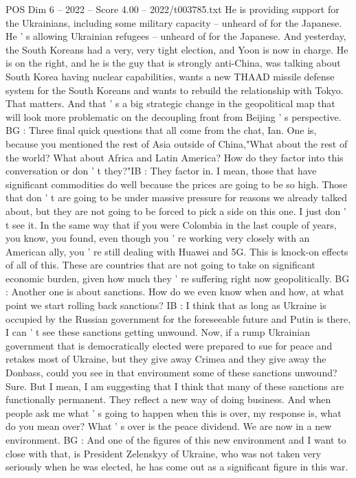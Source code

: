 \begin{textsample}{POS Dim 6 – 2022 – Score 4.00 – 2022/t003785.txt}
He is providing support for the Ukrainians, including some military capacity -- unheard of for the Japanese.
He ' s allowing Ukrainian refugees -- unheard of for the Japanese.
And yesterday, the South Koreans had a very, very tight election, and Yoon is now in charge.
He is on the right, and he is the guy that is strongly anti-China, was talking about South Korea having nuclear capabilities, wants a new THAAD missile defense system for the South Koreans and wants to rebuild the relationship with Tokyo.
That matters.
And that ' s a big strategic change in the geopolitical map that will look more problematic on the decoupling front from Beijing ' s perspective.
BG : Three final quick questions that all come from the chat, Ian.
One is, because you mentioned the rest of Asia outside of China,"What about the rest of the world?
What about Africa and Latin America?
How do they factor into this conversation or don ' t they?"IB : They factor in.
I mean, those that have significant commodities do well because the prices are going to be so high.
Those that don ' t are going to be under massive pressure for reasons we already talked about, but they are not going to be forced to pick a side on this one.
I just don ' t see it.
In the same way that if you were Colombia in the last couple of years, you know, you found, even though you ' re working very closely with an American ally, you ' re still dealing with Huawei and 5G.
This is knock-on effects of all of this.
These are countries that are not going to take on significant economic burden, given how much they ' re suffering right now geopolitically.
BG : Another one is about sanctions.
How do we even know when and how, at what point we start rolling back sanctions?
IB : I think that as long as Ukraine is occupied by the Russian government for the foreseeable future and Putin is there, I can ' t see these sanctions getting unwound.
Now, if a rump Ukrainian government that is democratically elected were prepared to sue for peace and retakes most of Ukraine, but they give away Crimea and they give away the Donbass, could you see in that environment some of these sanctions unwound?
Sure.
But I mean, I am suggesting that I think that many of these sanctions are functionally permanent.
They reflect a new way of doing business.
And when people ask me what ' s going to happen when this is over, my response is, what do you mean over?
What ' s over is the peace dividend.
We are now in a new environment.
BG : And one of the figures of this new environment and I want to close with that, is President Zelenskyy of Ukraine, who was not taken very seriously when he was elected, he has come out as a significant figure in this war.

\end{textsample}
